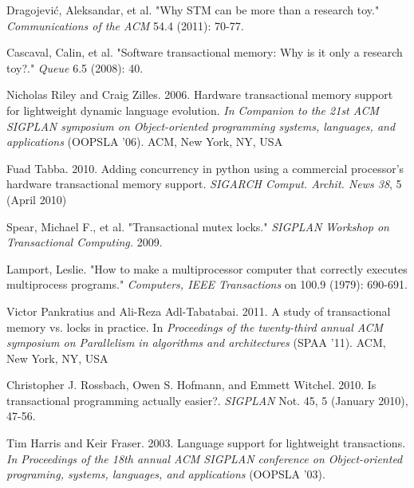 \documentclass{sigplanconf}
\begin{document}
\begin{thebibliography}{}
  Dragojević, Aleksandar, et al. "Why STM can be more than a research
  toy." \emph{Communications of the ACM} 54.4 (2011): 70-77.

  Cascaval, Calin, et al. "Software transactional memory: Why is it
  only a research toy?." \emph{Queue} 6.5 (2008): 40.

  Nicholas Riley and Craig Zilles. 2006. Hardware transactional memory
  support for lightweight dynamic language evolution. \emph{In
    Companion to the 21st ACM SIGPLAN symposium on Object-oriented
    programming systems, languages, and applications} (OOPSLA
  '06). ACM, New York, NY, USA

  Fuad Tabba. 2010. Adding concurrency in python using a commercial
  processor's hardware transactional memory support. \emph{SIGARCH
  Comput. Archit. News 38}, 5 (April 2010)



  Spear, Michael F., et al. "Transactional mutex locks." \emph{SIGPLAN
    Workshop on Transactional Computing.} 2009.

  Lamport, Leslie. "How to make a multiprocessor computer that
  correctly executes multiprocess programs." \emph{Computers, IEEE
    Transactions} on 100.9 (1979): 690-691.

  Victor Pankratius and Ali-Reza Adl-Tabatabai. 2011. A study of
  transactional memory vs. locks in practice. In \emph{Proceedings of
    the twenty-third annual ACM symposium on Parallelism in algorithms
    and architectures} (SPAA '11). ACM, New York, NY, USA

  Christopher J. Rossbach, Owen S. Hofmann, and Emmett
  Witchel. 2010. Is transactional programming actually
  easier?. \emph{SIGPLAN} Not. 45, 5 (January 2010), 47-56.

  Tim Harris and Keir Fraser. 2003. Language support for lightweight
  transactions. \emph{In Proceedings of the 18th annual ACM SIGPLAN
    conference on Object-oriented programing, systems, languages, and
    applications} (OOPSLA '03).


\end{thebibliography}
\end{document}
